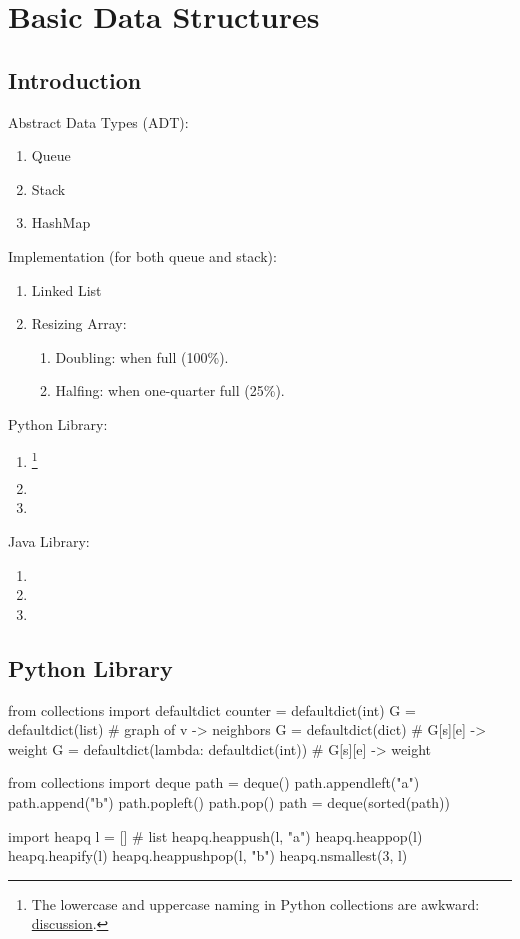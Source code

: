 \chapter{Basic Data  Structures}


\section{Introduction}
Abstract Data Types (ADT):
\begin{enumerate}
\item Queue
\item Stack
\item HashMap
\end{enumerate}
Implementation (for both queue and stack):
\begin{enumerate}
\item Linked List
\item Resizing Array:
\begin{enumerate}
\item Doubling: when full (100\%).
\item Halfing: when one-quarter full (25\%). 
\end{enumerate}
\end{enumerate}
Python Library:
\begin{enumerate}
\item {} \footnote{The lowercase and uppercase naming in Python collections are awkward: \href{http://stackoverflow.com/questions/18953681/naming-convention-in-collections-why-are-some-lowercase-and-others-capwords}{discussion}.}
\item {}
\item {}
\end{enumerate}
Java Library:
\begin{enumerate}
\item {}
\item {}
\item {}
\end{enumerate}

\section{Python Library}
\begin{python}
from collections import defaultdict
counter = defaultdict(int)
G = defaultdict(list)  # graph of v -> neighbors
G = defaultdict(dict)  # G[s][e] -> weight
G = defaultdict(lambda: defaultdict(int))  # G[s][e] -> weight


from collections import deque
path = deque()
path.appendleft("a")
path.append("b")
path.popleft()
path.pop()
path = deque(sorted(path))


import heapq
l = []  # list 
heapq.heappush(l, "a")
heapq.heappop(l)
heapq.heapify(l)
heapq.heappushpop(l, "b")
heapq.nsmallest(3, l)
\end{python}

